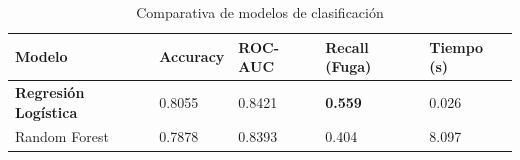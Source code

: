 
\begin{table}[h]
    \centering
    \caption{Comparativa de modelos de clasificación}
    \begin{tabular}{L{4cm}|C{1.8cm}|C{1.8cm}|C{2.2cm}|C{1.8cm}}
        \toprule
        \textbf{Modelo} & \textbf{Accuracy} & \textbf{ROC-AUC} & \textbf{Recall (Fuga)} & \textbf{Tiempo (s)} \\
        \midrule
        \textbf{Regresión Logística} & 0.8055 & 0.8421 & \textbf{0.559} & 0.026 \\
        Random Forest & 0.7878 & 0.8393 & 0.404 & 8.097 \\
        \bottomrule
    \end{tabular}
\end{table}